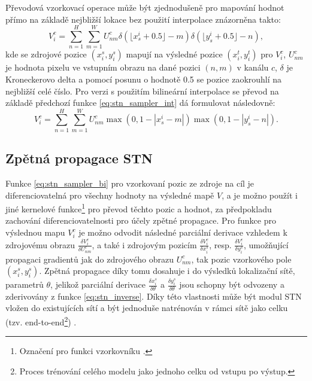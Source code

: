 Převodová vzorkovací operace může být zjednodušeně pro mapování hodnot přímo na základě nejbližší lokace bez použití interpolace znázorněna takto:
\begin{equation}
    V_i^c = \sum_{n=1}^{H} \sum_{m=1}^{W} U_{nm}^c \delta(\lfloor x_s^i + 0.5 \rfloor - m) \delta(\lfloor y_s^i + 0.5 \rfloor - n),
\label{eq:stn_sampler_int}
\end{equation}
kde se zdrojové pozice $(x_i^s, y_i^s)$ mapují na výsledné pozice $(x_i^t, y_i^t)$ pro $V_i^c$, $U_{nm}^c$ je hodnota pixelu ve vstupním obrazu na dané pozici $(n, m)$ v kanálu $c$, $\delta$ je Kroneckerovo delta a pomocí posunu o hodnotě 0.5 se pozice zaokrouhlí na nejbližší celé číslo. Pro verzi s použitím bilineární interpolace se převod na základě předchozí funkce \ref{eq:stn_sampler_int} dá formulovat následovně:
\begin{equation}
    V_i^c = \sum_{n=1}^{H} \sum_{m=1}^{W} U_{nm}^c \max(0, 1 - |x_s^i - m|) \max(0, 1 - |y_s^i - n|).
\label{eq:stn_sampler_bi}
\end{equation}

\subsection{Zpětná propagace STN}

Funkce \ref{eq:stn_sampler_bi} pro vzorkovaní pozic ze zdroje na cíl je diferenciovatelná pro všechny hodnoty na výsledné mapě $V$, a je možno použít i jiné kernelové funkce\footnote{Označení pro funkci vzorkovníku \cite{stn}.} pro převod těchto pozic a hodnot, za předpokladu zachování diferenciovatelnosti pro účely zpětné propagace. Pro funkce pro výslednou mapu $V_i^c$ je možno odvodit následné parciální derivace vzhledem k zdrojovému obrazu $\frac{\delta V_i^c}{\delta U_{nm}^c}$, a také i zdrojovým pozicím $\frac{\delta V_i^c}{\delta x_i^s}$, resp. $\frac{\delta V_i^c}{\delta y_i^s}$, umožňující propagaci gradientů jak do zdrojového obrazu $U_{nm}^c$, tak pozic vzorkového pole $(x_i^s, y_i^s)$. Zpětná propagace díky tomu dosahuje i do výsledků lokalizační sítě, parametrů $\theta$, jelikož parciální derivace $\frac{\delta x_i^s}{\delta \theta}$ a $\frac{\delta y_i^s}{\delta \theta}$ jsou schopny být odvozeny a zderivovány z funkce \ref{eq:stn_inverse}. Díky této vlastnosti může být modul STN vložen do existujících sítí a být jednoduše natrénován v rámci sítě jako celku (tzv. end-to-end\footnote{Proces trénování celého modelu jako jednoho celku od vstupu po výstup.}) \cite{stn}. 
\endinput